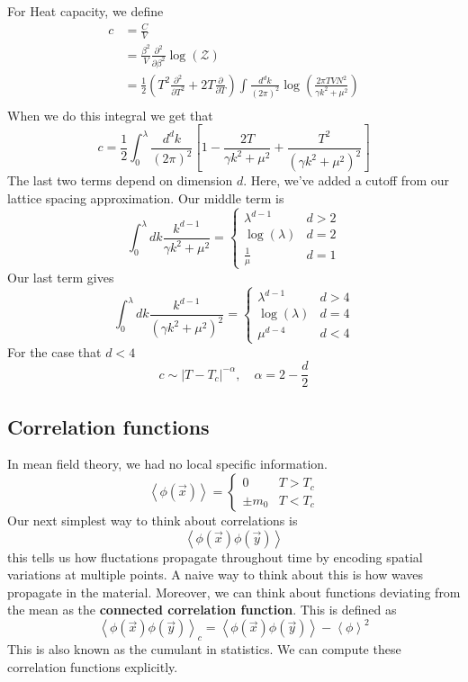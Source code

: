 \documentclass[11pt, oneside]{article}   	%
\begin{document}
For Heat capacity, we define 
\begin{align*}
	c &=  \frac{C}{V } \\
	  &=  \frac{\beta^2}{V  } \frac{\partial^ 2 }{\partial \beta^2 } \log ( \mathcal{ Z })  \\
	  &=  \frac{1}{2 } \left( T^2 \frac{\partial ^2 }{\partial T^ 2}  + 2T \frac{\partial  }{\partial T }  \right) \int \frac{d^{ d }k }{ ( 2 \pi ) ^ 2 } \log \left( \frac{ 2 \pi T V N^ 2 }{ \gamma k^ 2 + \mu^ 2 } \right)  \\
\end{align*} 
When we do this integral we get that 
\[
	c = \frac{1}{2 } \int_0^{ \lambda }  \frac{ d^{ d }k }{ ( 2 \pi ) ^  2} \left[ 1 - \frac{ 2T }{\gamma k^ 2 + \mu ^ 2 } + \frac{ T^ 2 }{ ( \gamma k^2 + \mu^ 2 )^ 2 } \right] 
\] The last two terms depend on dimension $ d $.
Here, we've added a cutoff from our lattice spacing approximation. 
Our middle term is 
\[
 \int_{ 0 }^\lambda dk \frac{ k^{ d - 1 } }{\gamma k^2 + \mu^2 } = \begin{cases}
 \lambda^{ d - 1} & d > 2 \\
 \log ( \lambda ) & d = 2 \\
 \frac{1}{\mu} & d =1 
 \end{cases} 
\] Our last term gives 
\[
	\int_{ 0 }^\lambda dk \frac{k^{ d - 1 }  }{ ( \gamma k ^ 2+ \mu^ 2)^ 2  } = \begin{cases}
		\lambda^{ d - 1} & d > 4 \\
		\log ( \lambda ) & d = 4 \\
		\mu^{ d - 4 } & d < 4 
	\end{cases}
\] For the case that $ d < 4 $
 \[
 c \sim | T - T_c |^{ - \alpha}, \quad \alpha  = 2 - \frac{d}{2 }
\] 

\subsection{Correlation functions} 
In mean field theory, we had no local specific information. 
\[
	\left< \phi ( \vec{x} )  \right> =  \begin{cases}
		0 & T > T_c \\
		\pm m_0 & T < T_c 
	\end{cases}
\] Our next simplest way to think about correlations is
\[
	\left< \phi ( \vec{x} ) \phi ( \vec{y} )  \right>
\] this tells us how fluctations propagate throughout time by encoding spatial
variations at multiple points. A naive way to 
think about this is how waves propagate in the material. 
Moreover, we can think about functions deviating from the mean
as the \textbf{connected correlation function}. 
This is defined as 
\[
	\left< \phi ( \vec{x} ) \phi( \vec{y} )  \right>_c = \left< \phi( \vec{x} ) \phi ( \vec{y} )  \right> - \left< \phi  \right>^2 
\] This is also known as the cumulant in statistics. 
We can compute these correlation functions explicitly. 
\end{document}
